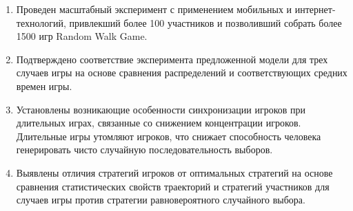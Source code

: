 \begin{enumerate}
  \item Проведен масштабный эксперимент с применением мобильных и интернет-технологий, привлекший более 100 участников и позволивший собрать более 1500 игр Random Walk Game. 
  \item Подтверждено соответствие эксперимента предложенной модели для трех случаев игры на основе сравнения распределений и соответствующих средних времен игры. 
  \item Установлены возникающие особенности синхронизации игроков при длительных играх, связанные со снижением концентрации игроков. Длительные игры утомляют игроков, что снижает способность человека генерировать чисто случайную последовательность выборов.
  \item Выявлены отличия стратегий игроков от оптимальных стратегий на основе сравнения статистических свойств траекторий и стратегий участников для случаев игры против стратегии равновероятного случайного выбора.
\end{enumerate}
